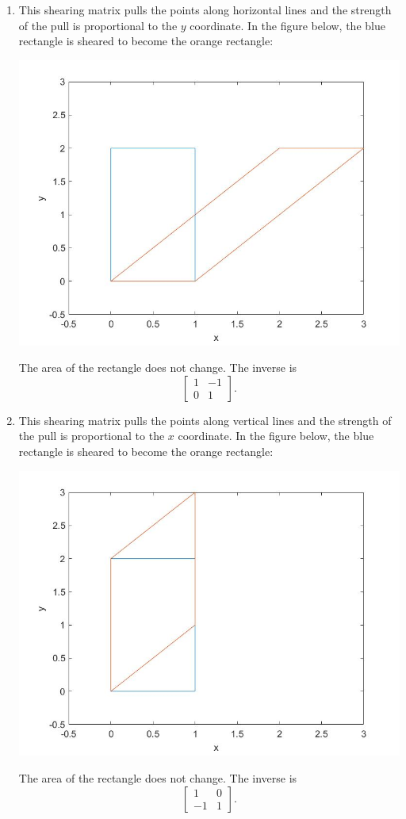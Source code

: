 \begin{sol}
\begin{enumerate}
    \item This shearing matrix pulls the points along horizontal lines and the strength of the pull is proportional to the $y$ coordinate. In the figure below, the blue rectangle is sheared to become the orange rectangle:
        \begin{center}
        \includegraphics[width=.75\textwidth]{FacesDay2/figs/xshear.jpg}
        \label{fig:xshear}
    \end{center}
    The area of the rectangle does not change. The inverse is
    $$\begin{bmatrix}
    1 & -1 \\ 0 & 1
    \end{bmatrix}.$$
    
        \item This shearing matrix pulls the points along vertical lines and the strength of the pull is proportional to the $x$ coordinate. In the figure below, the blue rectangle is sheared to become the orange rectangle: 
        \begin{center}
        \includegraphics[width=.75\textwidth]{FacesDay2/figs/yshear.jpg}
        \label{fig:yshear}
    \end{center}
        The area of the rectangle does not change. The inverse is
    $$\begin{bmatrix}
    1 & 0 \\ -1 & 1
    \end{bmatrix}.$$
    

\end{enumerate}
\end{sol}
